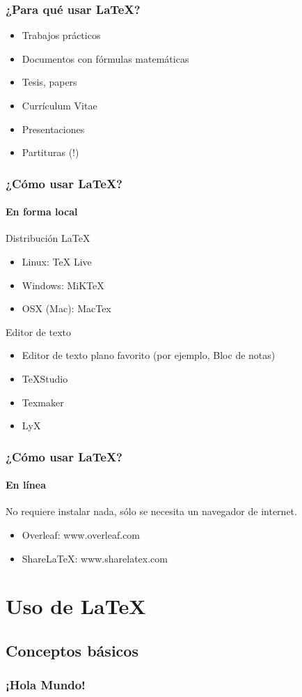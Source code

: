\documentclass[svgnames]{beamer}
\begin{document}
\begin{frame}
  \frametitle{¿Para qué usar \LaTeX?}
  \begin{itemize}
    \item Trabajos prácticos
    \item Documentos con fórmulas matemáticas
    \item Tesis, papers
    \item Currículum Vitae
    \item Presentaciones
    \item Partituras (!)
  \end{itemize}
\end{frame}

\begin{frame}
  \frametitle{¿Cómo usar \LaTeX?}
  \framesubtitle{En forma local}
  Distribución \LaTeX
  \begin{itemize}
    \item Linux: TeX Live
    \item Windows: MiKTeX
    \item OSX (Mac): MacTex
  \end{itemize}

  Editor de texto
  \begin{itemize}
    \item Editor de texto plano favorito (por ejemplo, Bloc de notas)
    \item TeXStudio
    \item Texmaker
    \item LyX
  \end{itemize}
\end{frame}

\begin{frame}
  \frametitle{¿Cómo usar \LaTeX?}
  \framesubtitle{En línea}
  No requiere instalar nada, sólo se necesita un navegador de internet.
  \begin{itemize}
    \item Overleaf: www.overleaf.com
    \item ShareLaTeX: www.sharelatex.com
  \end{itemize}
\end{frame}

\section{Uso de \LaTeX}

\subsection{Conceptos básicos}
\begin{frame}
  \frametitle{¡Hola Mundo!}
  
\end{frame}
\end{document}
